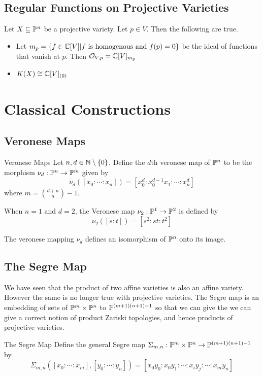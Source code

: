 \documentclass[a4paper]{article}
\begin{document}
\subsection{Regular Functions on Projective Varieties}
\begin{thm}{}{} Let $X\subseteq\mathbb{P}^n$ be a projective variety. Let $p\in V$. Then the following are true. 
\begin{itemize}
\item Let $m_p=\{f\in\mathbb{C}[V]|f\text{ is homogenous and }f(p)=0\}$ be the ideal of functions that vanish at $p$. Then $\mathcal{O}_{V,p}=\mathbb{C}[V]_{m_p}$
\item $K(X)\cong\mathbb{C}[V]_{(0)}$
\end{itemize}
\end{thm}

\pagebreak
\section{Classical Constructions}
\subsection{Veronese Maps}
\begin{defn}{Veronese Maps}{} Let $n,d\in\mathbb{N}\setminus\{0\}$. Define the $d$th veronese map of $\mathbb{P}^n$ to be the morphism $\nu_d:\mathbb{P}^n\to\mathbb{P}^m$ given by $$\nu_d([x_0:\cdots:x_n])=[x_0^d:x_0^{d-1}x_1:\cdots:x_n^d]$$ where $m=\binom{d+n}{n}-1$. 
\end{defn}

When $n=1$ and $d=2$, the Veronese map $\nu_2:\mathbb{P}^1\to\mathbb{P}^2$ is defined by $$\nu_2([s:t])=[s^2:st:t^2]$$

\begin{prp}{}{} The veronese mapping $\nu_d$ defines an isomorphism of $\mathbb{P}^n$ onto its image. 
\end{prp}

\subsection{The Segre Map}
We have seen that the product of two affine varieties is also an affine variety. However the same is no longer true with projective varieties. The Segre map is an embedding of sets of $\mathbb{P}^m\times\mathbb{P}^n$ to $\mathbb{P}^{(m+1)(n+1)-1}$ so that we can give the we can give a correct notion of product Zariski topologies, and hence products of projective varieties. 

\begin{defn}{The Segre Map}{} Define the general Segre map $\Sigma_{m,n}:\mathbb{P}^m\times\mathbb{P}^n\to\mathbb{P}^{(m+1)(n+1)-1}$ by $$\Sigma_{m,n}([x_0:\cdots:x_m],[y_0:\cdots:y_n])=[x_0y_0:x_0y_1:\cdots:x_iy_j:\cdots:x_my_n]$$
\end{defn}
\end{document}
